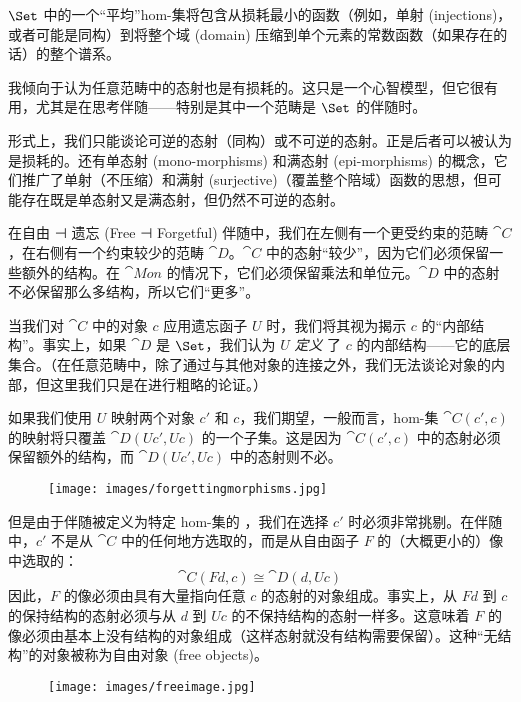 $\Set$ 中的一个“平均”hom-集将包含从损耗最小的函数（例如，单射 (injections)，或者可能是同构）到将整个域 (domain) 压缩到单个元素的常数函数（如果存在的话）的整个谱系。

我倾向于认为任意范畴中的态射也是有损耗的。这只是一个心智模型，但它很有用，尤其是在思考伴随——特别是其中一个范畴是 $\Set$ 的伴随时。

形式上，我们只能谈论可逆的态射（同构）或不可逆的态射。正是后者可以被认为是损耗的。还有单态射 (mono-morphisms) 和满态射 (epi-morphisms) 的概念，它们推广了单射（不压缩）和满射 (surjective)（覆盖整个陪域）函数的思想，但可能存在既是单态射又是满态射，但仍然不可逆的态射。

在自由 ⊣ 遗忘 (Free ⊣ Forgetful) 伴随中，我们在左侧有一个更受约束的范畴 $\cat{C}$，在右侧有一个约束较少的范畴 $\cat{D}$。$\cat{C}$ 中的态射“较少”，因为它们必须保留一些额外的结构。在 $\cat{Mon}$ 的情况下，它们必须保留乘法和单位元。$\cat{D}$ 中的态射不必保留那么多结构，所以它们“更多”。

当我们对 $\cat{C}$ 中的对象 $c$ 应用遗忘函子 $U$ 时，我们将其视为揭示 $c$ 的“内部结构”。事实上，如果 $\cat{D}$ 是 $\Set$，我们认为 $U$ \emph{定义} 了 $c$ 的内部结构——它的底层集合。（在任意范畴中，除了通过与其他对象的连接之外，我们无法谈论对象的内部，但这里我们只是在进行粗略的论证。）

如果我们使用 $U$ 映射两个对象 $c'$ 和 $c$，我们期望，一般而言，hom-集 $\cat{C}(c', c)$ 的映射将只覆盖 $\cat{D}(U c', U c)$ 的一个子集。这是因为 $\cat{C}(c', c)$ 中的态射必须保留额外的结构，而 $\cat{D}(U c', U c)$ 中的态射则不必。

\begin{figure}[H]
  \centering
  \texttt{[image: images/forgettingmorphisms.jpg]}
\end{figure}

\noindent
但是由于伴随被定义为特定 hom-集的 ，我们在选择 $c'$ 时必须非常挑剔。在伴随中，$c'$ 不是从 $\cat{C}$ 中的任何地方选取的，而是从自由函子 $F$ 的（大概更小的）像中选取的：
\[\cat{C}(F d, c) \cong \cat{D}(d, U c)\]
因此，$F$ 的像必须由具有大量指向任意 $c$ 的态射的对象组成。事实上，从 $F d$ 到 $c$ 的保持结构的态射必须与从 $d$ 到 $U c$ 的不保持结构的态射一样多。这意味着 $F$ 的像必须由基本上没有结构的对象组成（这样态射就没有结构需要保留）。这种“无结构”的对象被称为自由对象 (free objects)。

\begin{figure}[H]
  \centering
  \texttt{[image: images/freeimage.jpg]}
\end{figure}

